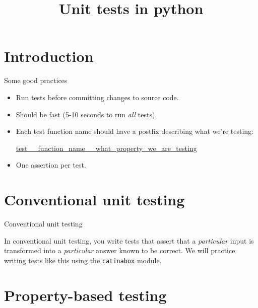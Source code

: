 \documentclass[10pt]{beamer}
\title{Unit tests in python}
\begin{document}
\maketitle

\section{Introduction}

\begin{frame}{Some good practices}

\begin{itemize}
\item Run tests before committing changes to source code. 
\item Should be \alert{fast} (5-10 seconds to run \textit{all} tests).
\item Each test function name should have a postfix describing what we're testing:
	\begin{center}\url{test__function_name__what_property_we_are_testing}	
	\end{center}
\item One assertion per test.
\end{itemize} 
\end{frame}



\section{Conventional unit testing}
\begin{frame}{Conventional unit testing}

In \alert{conventional unit testing}, you write tests that assert that a \textit{particular} input is transformed into a \textit{particular} answer known to be correct.
\vfill 
We will practice writing tests like this using the \texttt{catinabox} module.
\end{frame}


\section{Property-based testing}
\end{document}
